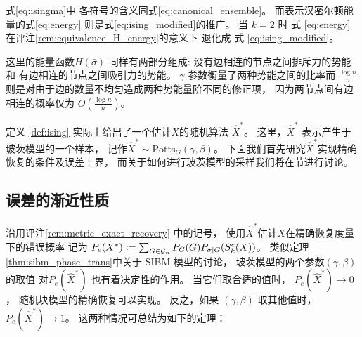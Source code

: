 式\eqref{eq:isingma}中
各符号的含义同式\eqref{eq:canonical_ensemble}。
而表示汉密尔顿能量的式\eqref{eq:energy}
则是式\eqref{eq:ising_modified}的推广。
当  $k=2$ 时 式 \eqref{eq:energy}
在评注\ref{rem:equivalence_H_energy}的意义下
退化成 式 \eqref{eq:ising_modified}。 

这里的能量函数$H(\bar{\sigma})$ 同样有两部分组成:
没有边相连的节点之间排斥力的势能和
有边相连的节点之间吸引力的势能。
$\gamma$ 参数衡量了两种势能之间的比率而
$\frac{\log n}{n}$ 则是对由于边的数量不均匀造成两种势能量阶不同的修正项，
因为两节点间有边相连的概率仅为 $O(\frac{\log n}{n})$。

定义 \ref{def:ising} 实际上给出了一个估计$X$的随机算法 $\hat{X}^*$。
这里，$\hat{X}^*$ 表示产生于玻茨模型的一个样本，
记作$\hat{X}^* \sim \textrm{Potts}_G(\gamma, \beta)$。
下面我们首先研究$\hat{X}^*$实现精确恢复的条件及误差上界，
而关于如何进行玻茨模型的采样我们将在节进行讨论。
\subsection{误差的渐近性质}
沿用评注\ref{rem:metric_exact_recovery} 中的记号，
使用$\hat{X}^*$估计$X$在精确恢复度量下的错误概率
记为 $P_e(\hat{X}^*) := \sum_{G \in \mathcal{G}_n} P_G(G) P_{\sigma | G}(S^c_k(X))$。
类似定理\ref{thm:sibm_phase_trans}中关于 SIBM 模型的讨论，
玻茨模型的两个参数$(\gamma, \beta)$ 的取值
对$P_e(\hat{X}^*)$
也有着决定性的作用。
当它们取合适的值时， 
$ P_e(\hat{X}^*)\to 0$，
随机块模型的精确恢复可以实现。
反之，如果 $(\gamma, \beta)$ 取其他值时，
$P_e(\hat{X}^*) \to 1$。
这两种情况可总结为如下的定理：

